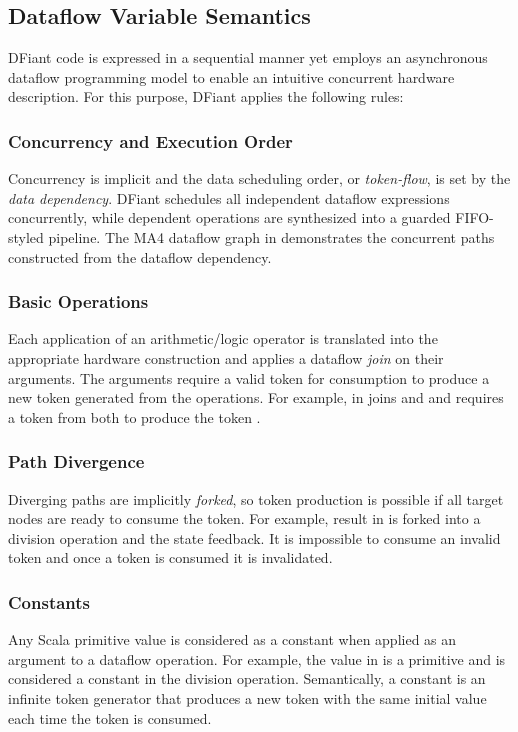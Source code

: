 \subsection{Dataflow Variable Semantics}
DFiant code is expressed in a sequential manner yet employs an asynchronous dataflow programming model to enable an intuitive concurrent hardware description. For this purpose, DFiant applies the following rules:

\subsubsection{Concurrency and Execution Order} 
Concurrency is implicit and the data scheduling order, or \textit{token-flow}, is set by the \textit{data dependency}. DFiant schedules all independent dataflow expressions concurrently, while dependent operations are synthesized into a guarded FIFO-styled pipeline. The MA4 dataflow graph in  demonstrates the concurrent paths constructed from the dataflow dependency. 

\subsubsection{Basic Operations} 
\label{sec:basic_ops}
Each application of an arithmetic/logic operator is translated into the appropriate hardware construction and applies a dataflow \emph{join} on their arguments. The arguments require a valid token for consumption to produce a new token generated from the operations. For example, \code{+} in  joins  and  and requires a token from both to produce the token .

\subsubsection{Path Divergence} 
\label{sec:path_div}
Diverging paths are implicitly \emph{forked}, so token production is possible if all target nodes are ready to consume the token. For example,  result in  is forked into a division operation and the state feedback.	It is impossible to consume an invalid token and once a token is consumed it is invalidated.

\subsubsection{Constants} 
Any Scala primitive value is considered as a constant when applied as an argument to a dataflow operation. For example, the value  in  is a primitive  and is considered a constant in the division operation. Semantically, a constant is an infinite token generator that produces a new token with the same initial value each time the token is consumed.

